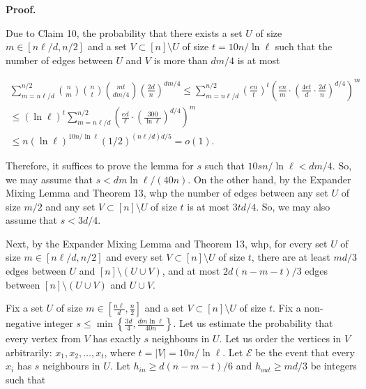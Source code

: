 


\par\medskip\noindent\textbf{Proof.}\par




Due to Claim 10, the probability that there exists a set $U$ of size $m\in[n\ell/d,n/2]$ and a set $V\subset[n]\setminus U$ of size $t=10n/\ln\ell$ such that the number of edges between $U$ and $V$ is more than $dm/4$ is at most\par


\[\begin{gathered}
\displaystyle\sum_{m=n\ell/d}^{n/2}{n\choose m}{n\choose t}{mt\choose dm/4}\left(\frac{2d}{n}\right)^{dm/4} \displaystyle\leq\sum_{m=n\ell/d}^{n/2}\left(\frac{en}{t}\right)^{t}\left(\frac{en}{m}\cdot\left(\frac{4et}{d}\cdot\frac{2d}{n}\right)^{d/4}\right)^{m} \\
\displaystyle\leq(\ln\ell)^{t}\sum_{m=n\ell/d}^{n/2}\left(\frac{ed}{\ell}\cdot\left(\frac{300}{\ln\ell}\right)^{d/4}\right)^{m} \\
\displaystyle\leq n(\ln\ell)^{10n/\ln\ell}\left(1/2\right)^{(n\ell/d)d/5}=o(1).
\end{gathered}\]


Therefore, it suffices to prove the lemma for $s$ such that $10sn/\ln\ell<dm/4$. So, we may assume that $s<dm\ln\ell/(40n)$. On the other hand, by the Expander Mixing Lemma and Theorem 13, whp the number of edges between any set $U$ of size $m/2$ and any set $V\subset[n]\setminus U$ of size $t$ is at most $3td/4$. So, we may also assume that $s<3d/4$.\par




Next, by the Expander Mixing Lemma and Theorem 13, whp, for every set $U$ of size $m\in[n\ell/d,n/2]$ and every set $V\subset[n]\setminus U$ of size $t$, there are at least $md/3$ edges between $U$ and $[n]\setminus(U\cup V)$, and at most $2d(n-m-t)/3$ edges between $[n]\setminus(U\cup V)$ and $U\cup V$.\par




Fix a set $U$ of size $m\in[\frac{n\ell}{d},\frac{n}{2}]$ and a set $V\subset[n]\setminus U$ of size $t$. Fix a non-negative integer
$s\leq\min\left\{\frac{3d}{4},\frac{dm\ln\ell}{40n}\right\}$. Let us estimate the probability that every vertex from $V$ has exactly $s$ neighbours in $U$. Let us order the vertices in $V$ arbitrarily: $x_{1},x_{2},\ldots,x_{t}$, where $t=|V|=10n/\ln\ell$. Let $\mathcal{E}$ be the event that every $x_{i}$ has $s$ neighbours in $U$. Let $h_{in}\geq d(n-m-t)/6$ and $h_{out}\geq md/3$ be integers such that\par


